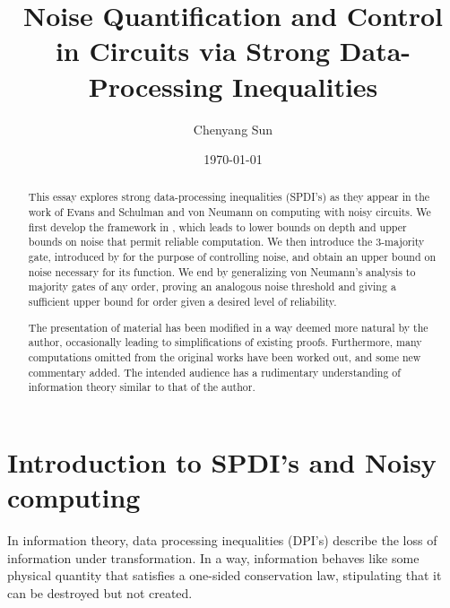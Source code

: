 \documentclass[12pt,reqno]{amsart}
\theoremstyle{plain} %
\theoremstyle{remark}
\theoremstyle{definition}
\begin{document}
\pagestyle{plain}{
\lhead{} \chead{} \rhead{}
\lfoot{} \cfoot{\thepage} \rfoot{}
}





\title{Noise Quantification and Control in Circuits via Strong Data-Processing Inequalities}
\author{Chenyang Sun}
\date{\today}

\begin{abstract}
This essay explores strong data-processing inequalities (SPDI's) as they appear in the work of Evans and Schulman \cite{ES} and von Neumann \cite{vN} on computing with noisy circuits. We first develop the framework in \cite{ES}, which leads to lower bounds on depth and upper bounds on noise that permit reliable computation. We then introduce the $3$-majority gate, introduced by \cite{vN} for the purpose of controlling noise, and obtain an upper bound on noise necessary for its function. We end by generalizing von Neumann's analysis to majority gates of any order, proving an analogous noise threshold and giving a sufficient upper bound for order given a desired level of reliability. 

The presentation of material has been modified in a way deemed more natural by the author, occasionally leading to simplifications of existing proofs. Furthermore, many computations omitted from the original works have been worked out, and some new commentary added. The intended audience has a rudimentary understanding of information theory similar to that of the author.
\end{abstract}
\maketitle
\thispagestyle{empty}






\section{Introduction to SPDI's and Noisy computing} \label{sect:1}

In information theory, data processing inequalities (DPI's) describe the loss of information under transformation. In a way, information behaves like some physical quantity that satisfies a one-sided conservation law, stipulating that it can be destroyed but not created.
\end{document}
